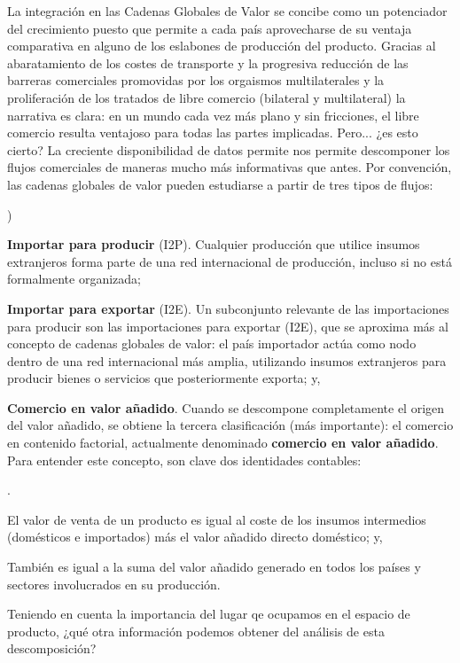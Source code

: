 \documentclass[10pt,a4paper]{article}
\newcounter{alphaitem}
\newcounter{numitem}
\newenvironment{la}
      {\begin{list}{\alph{alphaitem})}{%
          \usecounter{alphaitem}%
          \setlength{\leftmargin}{1cm}%
          \setlength{\parskip}{3pt}%
          \setlength{\itemsep}{0pt}%
          \setlength{\parsep}{0pt}%
      }}
      {\end{list}}
\newenvironment{lnum}
      {\begin{list}{\arabic{numitem}.}{%
          \usecounter{numitem}%
          \setlength{\leftmargin}{1cm}%
          \setlength{\parskip}{3pt}%
          \setlength{\itemsep}{0pt}%
          \setlength{\parsep}{0pt}%
      }}
      {\end{list}}
\begin{document}
La integración en las Cadenas Globales de Valor se concibe como un potenciador del crecimiento puesto que permite a cada país aprovecharse de su ventaja comparativa en alguno de los eslabones de producción del producto. Gracias al abaratamiento de los costes de transporte y la progresiva reducción de las barreras comerciales promovidas por los orgaismos multilaterales y la proliferación de los tratados de libre comercio (bilateral y multilateral) la narrativa es clara: en un mundo cada vez más plano y sin fricciones, el libre comercio resulta ventajoso para todas las partes implicadas. Pero... ¿es esto cierto? La creciente disponibilidad de datos permite nos permite descomponer los flujos comerciales de maneras mucho más informativas que antes. Por convención, las cadenas globales de valor pueden estudiarse a partir de tres tipos de flujos:
\begin{la}
    \item \textbf{Importar para producir} (I2P). Cualquier producción que utilice insumos extranjeros forma parte de una red internacional de producción, incluso si no está formalmente organizada;
    \item \textbf{Importar para exportar} (I2E). Un subconjunto relevante de las importaciones para producir son las importaciones para exportar (I2E), que se aproxima más al concepto de cadenas globales de valor: el país importador actúa como nodo dentro de una red internacional más amplia, utilizando insumos extranjeros para producir bienes o servicios que posteriormente exporta; y,
    \item \textbf{Comercio en valor añadido}. Cuando se descompone completamente el origen del valor añadido, se obtiene la tercera clasificación (más importante): el comercio en contenido factorial, actualmente denominado \textbf{comercio en valor añadido}. Para entender este concepto, son clave dos identidades contables:
    \begin{lnum}
        \item El valor de venta de un producto es igual al coste de los insumos intermedios (domésticos e importados) más el valor añadido directo doméstico; y,
        \item También es igual a la suma del valor añadido generado en todos los países y sectores involucrados en su producción.
    \end{lnum}
\end{la}

Teniendo en cuenta la importancia del lugar qe ocupamos en el espacio de producto, ¿qué otra información podemos obtener del análisis de esta descomposición?
\end{document}
